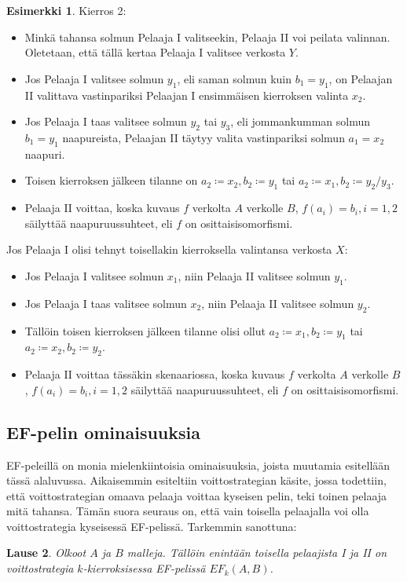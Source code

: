\documentclass[finnish]{tktltiki2}
\newtheorem{lau}{Lause}
\theoremstyle{definition}
\newtheorem{esim}[lau]{Esimerkki}
\theoremstyle{remark}
\begin{document}
\begin{esim}
Kierros 2:
\begin{itemize}
  \item Minkä tahansa solmun Pelaaja I valitseekin, Pelaaja II voi peilata valinnan. Oletetaan, että tällä kertaa Pelaaja I valitsee verkosta $Y$.
  \item Jos Pelaaja I valitsee solmun $y_1$, eli saman solmun kuin $b_1 = y_1$, on Pelaajan II valittava vastinpariksi Pelaajan I ensimmäisen kierroksen valinta $x_2$.
  \item Jos Pelaaja I taas valitsee solmun $y_2$ tai $y_3$, eli jommankumman solmun $b_1 = y_1$ naapureista, Pelaajan II täytyy valita vastinpariksi solmun $a_1 = x_2$ naapuri.
  \item Toisen kierroksen jälkeen tilanne on $a_2 \coloneqq x_2, b_2 \coloneqq y_1$ tai $a_2 \coloneqq x_1, b_2 \coloneqq y_2/y_3$.
  \item Pelaaja II voittaa, koska kuvaus $f$ verkolta $A$ verkolle $B$, $f(a_i) = b_i, i = 1, 2$ säilyttää naapuruussuhteet, eli $f$ on osittaisisomorfismi.
\end{itemize}

Jos Pelaaja I olisi tehnyt toisellakin kierroksella valintansa verkosta $X$:
\begin{itemize}
\item Jos Pelaaja I valitsee solmun $x_1$, niin Pelaaja II valitsee solmun $y_1$.
\item Jos Pelaaja I taas valitsee solmun $x_2$, niin Pelaaja II valitsee solmun $y_2$.
\item Tällöin toisen kierroksen jälkeen tilanne olisi ollut $a_2 \coloneqq x_1, b_2 \coloneqq y_1$ tai $a_2 \coloneqq x_2, b_2 \coloneqq y_2$.
\item Pelaaja II voittaa tässäkin skenaariossa, koska kuvaus $f$ verkolta $A$ verkolle $B$, $f(a_i) = b_i, i = 1, 2$ säilyttää naapuruussuhteet, eli $f$ on osittaisisomorfismi.
\end{itemize}
\end{esim}

\subsection{EF-pelin ominaisuuksia}
EF-peleillä on monia mielenkiintoisia ominaisuuksia, joista muutamia esitellään tässä alaluvussa. Aikaisemmin esiteltiin voittostrategian käsite, jossa todettiin, että voittostrategian omaava pelaaja voittaa kyseisen pelin, teki toinen pelaaja mitä tahansa. Tämän suora seuraus on, että vain toisella pelaajalla voi olla voittostrategia kyseisessä EF-pelissä. Tarkemmin sanottuna:
\begin{lau}
Olkoot $A$ ja $B$ malleja. Tällöin enintään toisella pelaajista I ja II on voittostrategia $k$-kierroksisessa EF-pelissä $EF_k(A, B)$.
\end{lau}
\end{document}
